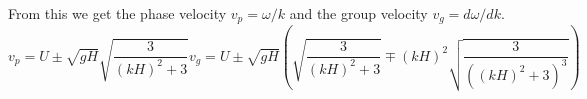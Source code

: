 From this we get the phase velocity $v_p = \omega / k$ and the group velocity $v_g = d \omega / d k$.
\begin{subequations}
	\label{eqn:WaveVelocities}
	\begin{equation}
	\label{eqn:WaveVelocitiesPhase}
	v_p = U \pm \sqrt{gH}\sqrt{\frac{3}{\left(kH\right)^2 + 3}}
	\end{equation}
	\begin{equation}
	\label{eqn:WaveVelocitiesGroup}
	v_g = U \pm \sqrt{gH} \left(\sqrt{\frac{3}{\left(kH\right)^2 + 3}} \mp \left(kH\right)^2 \sqrt{\frac{3}{\left(\left(kH\right)^2 + 3 \right)^3}}\right)
	\end{equation}
\end{subequations}



